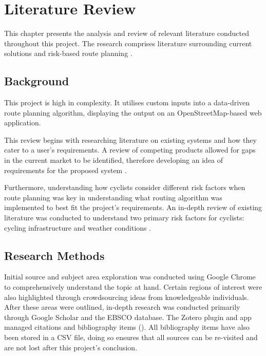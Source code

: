 \chapter{Literature Review} 
\label{chap:litrev}

This chapter presents the analysis and review of relevant literature conducted throughout this project. The research comprises literature surrounding current solutions  and risk-based route planning .

\section{Background}
\label{litrev:background}
This project is high in complexity. It utilises custom inputs into a data-driven route planning algorithm, displaying the output on an OpenStreetMap-based web application. 

This review begins with researching literature on existing systems and how they cater to a user's requirements. A review of competing products allowed for gaps in the current market to be identified, therefore developing an idea of requirements for the proposed system . 

Furthermore, understanding how cyclists consider different risk factors when route planning was key in understanding what routing algorithm was implemented to best fit the project's requirements. An in-depth review of existing literature was conducted to understand two primary risk factors for cyclists: cycling infrastructure  and weather conditions . 

\section{Research Methods}
\label{litrev:researchmethod}

Initial source and subject area exploration was conducted using Google Chrome to comprehensively understand the topic at hand. Certain regions of interest were also highlighted through crowdsourcing ideas from knowledgeable individuals. After these areas were outlined, in-depth research was conducted primarily through Google Scholar and the EBSCO database. The Zotero plugin and app managed citations and bibliography items (\cite{noauthor_zotero_nodate}). All bibliography items have also been stored in a CSV file, doing so ensures that all sources can be re-visited and are not lost after this project's conclusion.

